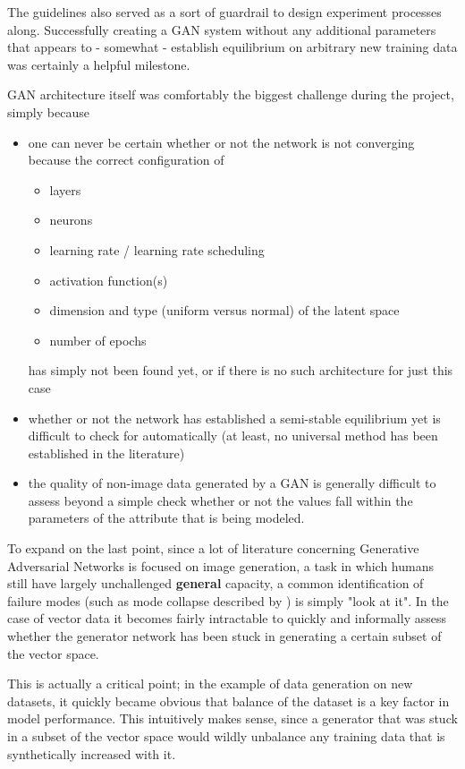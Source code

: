 The guidelines also served as a sort of guardrail to design experiment processes along. 
Successfully creating a \ac{GAN} system without any additional parameters that appears to - somewhat - establish equilibrium on arbitrary new training data was certainly a helpful milestone.

\ac{GAN} architecture itself was comfortably the biggest challenge during the project, simply because 
\begin{itemize}
	\item one can never be certain whether or not the network is not converging because the correct configuration of 
	\begin{itemize}
		\item layers
		\item neurons
		\item learning rate / learning rate scheduling
		\item activation function(s)
		\item dimension and type (uniform versus normal) of the latent space
		\item number of epochs
	\end{itemize} has simply not been found yet, or if there is no such architecture for just this case
	\item whether or not the network has established a semi-stable equilibrium yet is difficult to check for automatically (at least, no universal method has been established in the literature)
	\item the quality of non-image data generated by a \ac{GAN} is generally difficult to assess beyond a simple check whether or not the values fall within the parameters of the attribute that is being modeled.
\end{itemize}

To expand on the last point, since a lot of literature concerning Generative Adversarial Networks is focused on image generation, a task in which humans still have largely unchallenged \textbf{general} capacity, a common identification of failure modes (such as mode collapse described by \cite{mode_collapse}) is simply "look at it". In the case of vector data it becomes fairly intractable to quickly and informally assess whether the generator network has been stuck in generating a certain subset of the vector space.

This is actually a critical point; in the example of data generation on new datasets, it quickly became obvious that balance of the dataset is a key factor in model performance. This intuitively makes sense, since a generator that was stuck in a subset of the vector space would wildly unbalance any training data that is synthetically increased with it.


